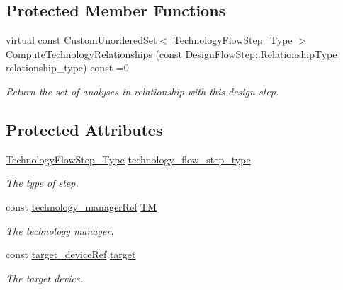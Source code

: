 \subsection*{Protected Member Functions}
\begin{DoxyCompactItemize}
\item 
virtual const \hyperlink{classCustomUnorderedSet}{Custom\+Unordered\+Set}$<$ \hyperlink{technology__flow__step_8hpp_a65208cfec963a7d7def292f9db428292}{Technology\+Flow\+Step\+\_\+\+Type} $>$ \hyperlink{classTechnologyFlowStep_ab543169c9b0143c8ae8831d765519075}{Compute\+Technology\+Relationships} (const \hyperlink{classDesignFlowStep_a723a3baf19ff2ceb77bc13e099d0b1b7}{Design\+Flow\+Step\+::\+Relationship\+Type} relationship\+\_\+type) const =0
\begin{DoxyCompactList}\small\item\em Return the set of analyses in relationship with this design step. \end{DoxyCompactList}\end{DoxyCompactItemize}
\subsection*{Protected Attributes}
\begin{DoxyCompactItemize}
\item 
\hyperlink{technology__flow__step_8hpp_a65208cfec963a7d7def292f9db428292}{Technology\+Flow\+Step\+\_\+\+Type} \hyperlink{classTechnologyFlowStep_a599a03a1ab1c3a71f3ac3bfbaed868b4}{technology\+\_\+flow\+\_\+step\+\_\+type}
\begin{DoxyCompactList}\small\item\em The type of step. \end{DoxyCompactList}\item 
const \hyperlink{technology__manager_8hpp_a4b9ecd440c804109c962654f9227244e}{technology\+\_\+manager\+Ref} \hyperlink{classTechnologyFlowStep_a4aeea30129ed65348c3bad932b3a135b}{TM}
\begin{DoxyCompactList}\small\item\em The technology manager. \end{DoxyCompactList}\item 
const \hyperlink{target__device_8hpp_acedb2b7a617e27e6354a8049fee44eda}{target\+\_\+device\+Ref} \hyperlink{classTechnologyFlowStep_a1a16880c55bddc3f9dbc495636d7a8cb}{target}
\begin{DoxyCompactList}\small\item\em The target device. \end{DoxyCompactList}\end{DoxyCompactItemize}
